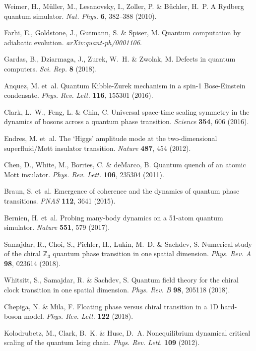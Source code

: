 \documentclass[prl,nobalancelastpage,superscriptaddress,twocolumn,nofootinbib]{revtex4}
\begin{document}
\begin{thebibliography}{}
 Weimer, H., M{\"u}ller, M., Lesanovsky, I., Zoller, P. \& B{\"u}chler, H.~P. A {{Rydberg}} quantum simulator. \emph{Nat. Phys.} \textbf{6}, 382--388 (2010).

 Farhi, E., Goldstone, J., Gutmann, S. \& Spiser, M. Quantum computation by adiabatic evolution. \emph{arXiv:quant-ph/0001106}.

 Gardas, B., Dziarmaga, J., Zurek, W.~H. \& Zwolak, M. Defects in quantum computers. \emph{Sci. Rep.} \textbf{8} (2018).

 Anquez, M. et~al. Quantum {K}ibble-{Z}urek mechanism in a spin-1 {B}ose-{E}instein condensate. \emph{Phys. Rev. Lett.} \textbf{116}, 155301 (2016).

 Clark, L.~W., Feng, L. \& Chin, C. Universal space-time scaling symmetry in the dynamics of bosons across a quantum phase transition. \emph{Science} \textbf{354}, 606 (2016).

 Endres, M. et~al. The ‘{H}iggs’ amplitude mode at the two-dimensional superfluid/{M}ott insulator transition.  \emph{Nature} \textbf{487}, 454 (2012).

 Chen, D., White, M., Borries, C. \& deMarco, B. Quantum quench of an atomic {M}ott insulator. \emph{Phys. Rev. Lett.} \textbf{106}, 235304 (2011).

 Braun, S. et~al. Emergence of coherence and the dynamics of quantum phase transitions. \emph{PNAS} \textbf{112}, 3641 (2015).

 Bernien, H. et~al. Probing many-body dynamics on a 51-atom quantum simulator. \emph{Nature} \textbf{551}, 579 (2017).

 Samajdar, R., Choi, S., Pichler, H., Lukin, M.~D. \& Sachdev, S. Numerical study of the chiral $\mathbb{Z}_3$ quantum
  phase transition in one spatial dimension. \emph{Phys. Rev. A} \textbf{98}, 023614 (2018).

 Whitsitt, S., Samajdar, R. \& Sachdev, S. Quantum field theory for the chiral clock transition in one spatial dimension. \emph{Phys. Rev. B} \textbf{98}, 205118 (2018).

 Chepiga, N. \& Mila, F. Floating phase versus chiral transition in a {1D} hard-boson model. \emph{Phys. Rev. Lett.} \textbf{122}  (2018).

 Kolodrubetz, M., Clark, B.~K. \& Huse, D.~A. Nonequilibrium dynamical critical scaling of the
  quantum {I}sing chain. \emph{Phys. Rev. Lett.} \textbf{109} (2012).


\end{thebibliography}
\end{document}
